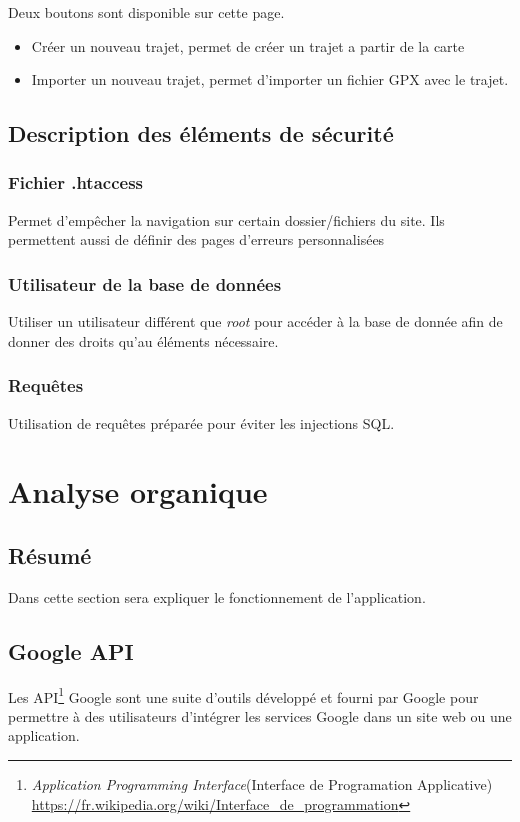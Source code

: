 \documentclass[a4paper]{article}
\begin{document}
Deux boutons sont disponible sur cette page.
\begin{itemize}
    \item Créer un nouveau trajet, permet de créer un trajet a partir de la carte
    \item Importer un nouveau trajet, permet d'importer un fichier GPX avec le trajet.
\end{itemize}

\subsection{Description des éléments de sécurité}
\subsubsection{Fichier .htaccess}
Permet d'empêcher la navigation sur certain dossier/fichiers du site. Ils permettent aussi de définir des pages d'erreurs personnalisées

\subsubsection{Utilisateur de la base de données}
Utiliser un utilisateur différent que \emph{root} pour accéder à la base de donnée afin de donner des droits qu'au éléments nécessaire.

\subsubsection{Requêtes}
Utilisation de requêtes préparée pour éviter les injections SQL.


\pagebreak








\pagebreak


\section{Analyse organique} 
\subsection{Résumé}
Dans cette section sera expliquer le fonctionnement de l'application.


\subsection{Google API}
Les API\footnote{\emph{Application Programming Interface}(Interface de Programation Applicative) \url{https://fr.wikipedia.org/wiki/Interface_de_programmation}} Google sont une suite d'outils développé et fourni par Google pour permettre à des utilisateurs d'intégrer les services Google dans un site web ou une application.
\end{document}
